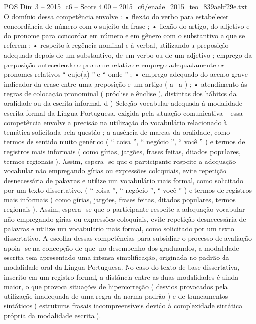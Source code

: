 \begin{textsample}{POS Dim 3 – 2015\_c6 – Score 4.00 – 2015\_c6/enade\_2015\_teo\_839aebf29e.txt}
O domínio dessa competência envolve : • flexão do verbo para estabelecer concordância de número com o sujeito da frase ; • flexão do artigo, do adjetivo e do pronome para concordar em número e em gênero com o substantivo a que se referem ; • respeito à regência nominal e à verbal, utilizando a preposição adequada depois de um substantivo, de um verbo ou de um adjetivo ; emprego da preposição antecedendo o pronome relativo e emprego adequadamente os pronomes relativos “ cujo(a) ” e “ onde ” ; • emprego adequado do acento grave indicador da crase entre uma preposição e um artigo ( a+a ) ; • atendimento às regras de colocação pronominal ( próclise e ênclise ), distintas dos hábitos da oralidade ou da escrita informal. d ) Seleção vocabular adequada à modalidade escrita formal da Língua Portuguesa, exigida pela situação comunicativa – essa competência envolve a precisão na utilização do vocabulário relacionado à temática solicitada pela questão ; a ausência de marcas da oralidade, como termos de sentido muito genérico ( “ coisa ”, “ negócio ”, “ você ” ) e termos de registros mais informais ( como gírias, jargões, frases feitas, ditados populares, termos regionais ).
Assim, espera -se que o participante respeite a adequação vocabular não empregando gírias ou expressões coloquiais, evite repetição desnecessária de palavras e utilize um vocabulário mais formal, como solicitado por um texto dissertativo. ( “ coisa ”, “ negócio ”, “ você ” ) e termos de registros mais informais ( como gírias, jargões, frases feitas, ditados populares, termos regionais ).
Assim, espera -se que o participante respeite a adequação vocabular não empregando gírias ou expressões coloquiais, evite repetição desnecessária de palavras e utilize um vocabulário mais formal, como solicitado por um texto dissertativo.
A escolha dessas competências para subsidiar o processo de avaliação apoia -se na concepção de que, no desempenho dos graduandos, a modalidade escrita tem apresentado uma intensa simplificação, originada no padrão da modalidade oral da Língua Portuguesa.
No caso do texto de base dissertativa, inscrito em um registro formal, a distância entre as duas modalidades é ainda maior, o que provoca situações de hipercorreção ( desvios provocados pela utilização inadequada de uma regra da norma-padrão ) e de truncamentos sintáticos ( estruturas frasais incompreensíveis devido à complexidade sintática própria da modalidade escrita ).

\end{textsample}
